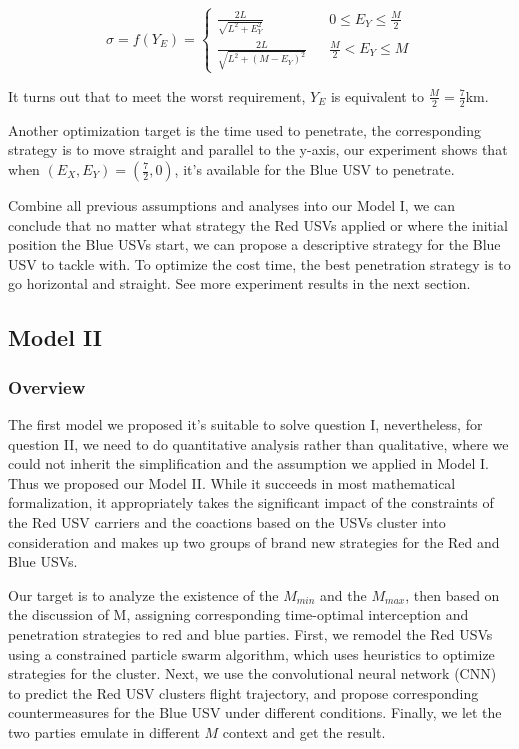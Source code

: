 \documentclass{mcmthesis}
\begin{document}
\begin{equation}
\sigma=f(Y_E)=\left\{
\begin{array}{rcl}
\frac{2L}{\sqrt{L^2+E_Y^2}} & & {0 \leq E_Y \leq \frac{M}{2}}\\
\frac{2L}{\sqrt{L^2+(M-E_Y)^2}} & & {\frac{M}{2} < E_Y \leq M }
\end{array} \right.
\end{equation}

It turns out that to meet the worst requirement, $Y_E$ is equivalent to $\frac{M}{2}=\frac{7}{2}$km.

Another optimization target is the time used to penetrate, the corresponding strategy is to move straight and parallel to the y-axis, our experiment shows that when $(E_X, E_Y) = (\frac{7}{2}, 0)$, it's available for the Blue USV to penetrate.

Combine all previous assumptions and analyses into our Model I, we can conclude that no matter what strategy the Red USVs applied or where the initial position the Blue USVs start, we can propose a descriptive strategy for the Blue USV to tackle with. To optimize the cost time, the best penetration strategy is to go horizontal and straight. See more experiment results in the next section.

\subsection{Model II}
\subsubsection{Overview}
The first model we proposed it's suitable to solve question I, nevertheless, for question II, we need to do quantitative analysis rather than qualitative, where we could not inherit the simplification and the assumption we applied in Model I. Thus we proposed our Model II. While it succeeds in most mathematical formalization, it appropriately takes the significant impact of the constraints of the Red USV carriers and the coactions based on the USVs cluster into consideration and makes up two groups of brand new strategies for the Red and Blue USVs. \par

Our target is to analyze the existence of the $M_{min}$ and the $M_{max}$, then based on the discussion of M, assigning corresponding time-optimal interception and penetration strategies to red and blue parties. First, we remodel the Red USVs using a constrained particle swarm algorithm, which uses heuristics to optimize strategies for the cluster. Next, we use the convolutional neural network (CNN) to predict the Red USV clusters flight trajectory, and propose corresponding countermeasures for the Blue USV under different conditions. Finally, we let the two parties emulate in different $M$ context and get the result.
\end{document}
